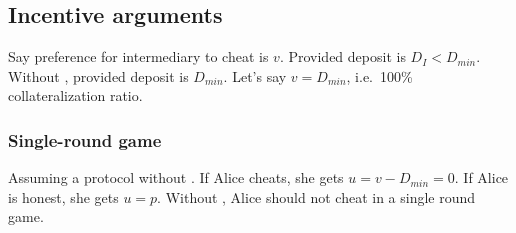 \begin{enumerate}




\subsection{Incentive arguments}


Say preference for intermediary to cheat is $v$.
Provided deposit is $D_I < D_{min}$.
Without \sys, provided deposit is $D_{min}$.
Let's say $v = D_{min}$, i.e.\ 100\% collateralization ratio.

\subsubsection{Single-round game}
Assuming a protocol without \sys.
If Alice cheats, she gets $u = v - D_{min} = 0$.
If Alice is honest, she gets $u = p$.
Without \sys, Alice should not cheat in a single round game.


\end{enumerate}
